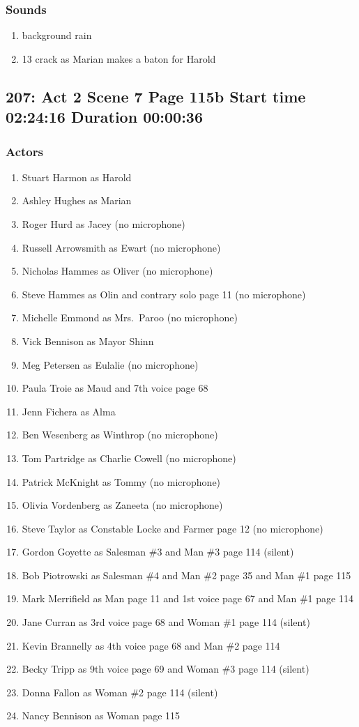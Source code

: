 \subsubsection{Sounds}
\begin{enumerate}
\item background rain
\item 13 crack as Marian makes a baton for Harold
\end{enumerate}
\subsection{207: Act 2 Scene 7 Page 115b Start time 02:24:16 Duration 00:00:36}

\subsubsection{Actors}
\begin{enumerate}
\item Stuart Harmon as Harold
\item Ashley Hughes as Marian
\item Roger Hurd as Jacey (no microphone)
\item Russell Arrowsmith as Ewart (no microphone)
\item Nicholas Hammes as Oliver (no microphone)
\item Steve Hammes as Olin and contrary solo page 11 (no microphone)
\item Michelle Emmond as Mrs.~Paroo (no microphone)
\item Vick Bennison as Mayor Shinn
\item Meg Petersen as Eulalie (no microphone)
\item Paula Troie as Maud and 7th voice page 68
\item Jenn Fichera as Alma
\item Ben Wesenberg as Winthrop (no microphone)
\item Tom Partridge as Charlie Cowell (no microphone)
\item Patrick McKnight as Tommy (no microphone)
\item Olivia Vordenberg as Zaneeta (no microphone)
\item Steve Taylor as Constable Locke and Farmer page 12 (no microphone)
\item Gordon Goyette as Salesman \#3 and Man \#3 page 114 (silent)
\item Bob Piotrowski as Salesman \#4 and Man \#2 page 35 and Man \#1 page 115
\item Mark Merrifield as Man page 11 and 1st voice page 67 and Man \#1 page 114
\item Jane Curran as 3rd voice page 68 and Woman \#1 page 114 (silent)
\item Kevin Brannelly as 4th voice page 68 and Man \#2 page 114
\item Becky Tripp as 9th voice page 69 and Woman \#3 page 114 (silent)
\item Donna Fallon as Woman \#2 page 114 (silent)
\item Nancy Bennison as Woman page 115
\end{enumerate}

